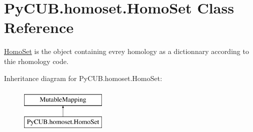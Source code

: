 \hypertarget{class_py_c_u_b_1_1homoset_1_1_homo_set}{}\section{Py\+C\+U\+B.\+homoset.\+Homo\+Set Class Reference}
\label{class_py_c_u_b_1_1homoset_1_1_homo_set}


\mbox{\hyperlink{class_py_c_u_b_1_1homoset_1_1_homo_set}{Homo\+Set}} is the object containing evrey homology as a dictionnary according to thie rhomology code.  


Inheritance diagram for Py\+C\+U\+B.\+homoset.\+Homo\+Set\+:\begin{figure}[H]
\begin{center}
\leavevmode
\includegraphics[height=2.000000cm]{class_py_c_u_b_1_1homoset_1_1_homo_set}
\end{center}
\end{figure}
